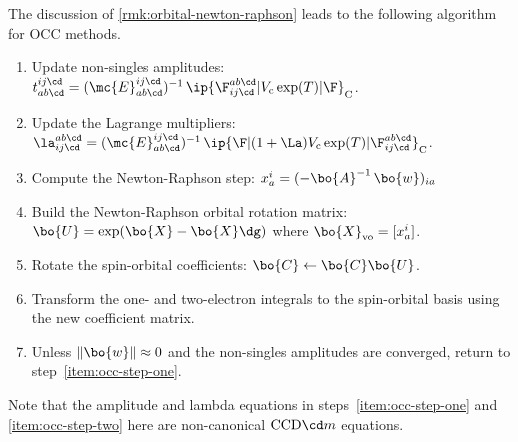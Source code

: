 \begin{rmk}
The discussion of \cref{rmk:orbital-newton-raphson} leads to the following algorithm for OCC methods.
\begin{enumerate}
\item
\label{item:occ-step-one}
Update non-singles amplitudes:
$
  t_{ab\cd}^{ij\cd}
=
  (\mc{E}_{ab\cd}^{ij\cd})^{-1}\,
  \ip{\F_{ij\cd}^{ab\cd}|
    V_{\text{c}}\,
    \text{exp}(T)
  |\F}_{\text{C}}
$.

\item
\label{item:occ-step-two}
Update the Lagrange multipliers:
$
  \la_{ij\cd}^{ab\cd}
=
  (\mc{E}_{ab\cd}^{ij\cd})^{-1}\,
  \ip{\F|
    (1 + \La)
    V_{\text{c}}\,
    \text{exp}(T)
  |\F_{ij\cd}^{ab\cd}}_{\text{C}}
$.

\item
Compute the Newton-Raphson step:
$
  x_a^i
=
  (-\bo{A}^{-1}\,\bo{w})_{ia}
$

\item
Build the Newton-Raphson orbital rotation matrix:
$
  \bo{U}
=
  \text{exp}(\bo{X} - \bo{X}\dg)
$
where
$
  \bo{X}_{\text{vo}}
=
  [x_a^i]
$.

\item
Rotate the spin-orbital coefficients:
$
  \bo{C}
\leftarrow
  \bo{C}\bo{U}
$.

\item
Transform the one- and two-electron integrals to the spin-orbital basis using the new coefficient matrix.

\item
Unless $\|\bo{w}\|\approx0$ and the non-singles amplitudes are converged, return to step~\ref{item:occ-step-one}.
\end{enumerate}
Note that the amplitude and lambda equations in steps~\ref{item:occ-step-one} and \ref{item:occ-step-two} here are non-canonical $\text{CCD}{\cd}m$ equations.
\end{rmk}


